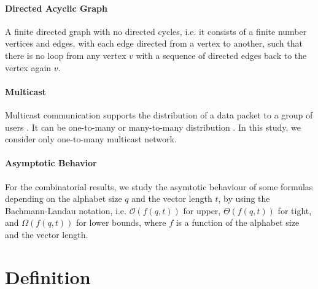 \paragraph{Directed Acyclic Graph}

A finite directed graph with no directed cycles, i.e. it consists
of a finite number vertices and edges, with each edge directed from
a vertex to another, such that there is no loop from any vertex $v$
with a sequence of directed edges back to the vertex again $v$.

\paragraph{Multicast}

Multicast communication supports the distribution of a data packet
to a group of users \cite{Zhang:2012}. It can be one-to-many or many-to-many
distribution \cite{Harte:2008}. In this study, we consider only one-to-many
multicast network.

\paragraph{Asymptotic Behavior}

For the combinatorial results, we study the asymtotic behaviour of
some formulas depending on the alphabet size $q$ and the vector length
$t$, by using the Bachmann-Landau notation, i.e. $\mathcal{O}\left(f\left(q,t\right)\right)$
for upper, $\Theta\left(f\left(q,t\right)\right)$ for tight, and
$\Omega\left(f\left(q,t\right)\right)$ for lower bounds, where $f$
is a function of the alphabet size and the vector length.

\section{Definition}

